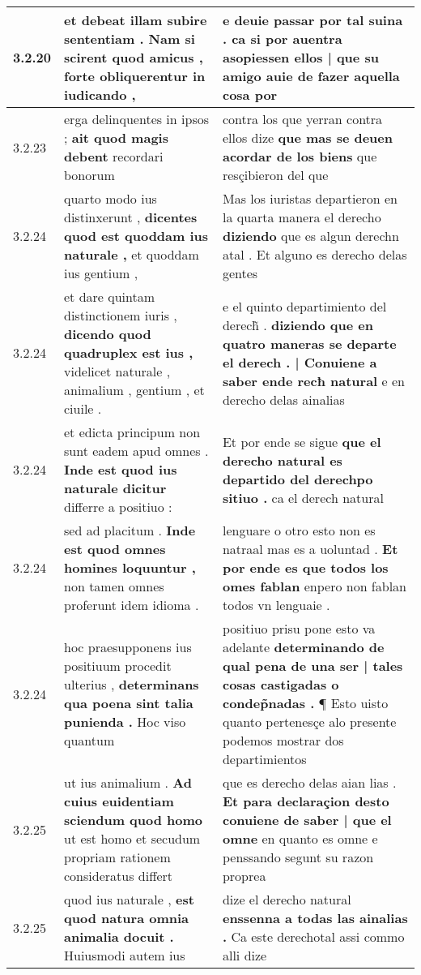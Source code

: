 \begin{tabular}{|p{1cm}|p{6.5cm}|p{6.5cm}|}
3.2.20 & et debeat illam subire sententiam . \textbf{ Nam si scirent quod amicus , } forte obliquerentur in iudicando , & e deuie passar por tal suina . \textbf{ ca si por auentra asopiessen ellos | que su amigo auie de fazer aquella cosa } por \\\hline
3.2.23 & erga delinquentes in ipsos ; \textbf{ ait quod magis debent } recordari bonorum & contra los que yerran contra ellos dize \textbf{ que mas se deuen acordar de los biens } que resçibieron del que \\\hline
3.2.24 & quarto modo ius distinxerunt , \textbf{ dicentes quod est quoddam ius naturale , } et quoddam ius gentium , & Mas los iuristas departieron en la quarta manera el derecho \textbf{ diziendo } que es algun derechn atal . Et alguno es derecho delas gentes \\\hline
3.2.24 & et dare quintam distinctionem iuris , \textbf{ dicendo quod quadruplex est ius , } videlicet naturale , animalium , gentium , et ciuile . & e el quinto departimiento del derech̃ . \textbf{ diziendo que en quatro maneras se departe el derech . | Conuiene a saber ende recħ natural } e en derecho delas ainalias \\\hline
3.2.24 & et edicta principum non sunt eadem apud omnes . \textbf{ Inde est quod ius naturale dicitur } differre a positiuo : & Et por ende se sigue \textbf{ que el derecho natural es departido del derechpo sitiuo . } ca el derech natural \\\hline
3.2.24 & sed ad placitum . \textbf{ Inde est quod omnes homines loquuntur , } non tamen omnes proferunt idem idioma . & lenguare o otro esto non es natraal mas es a uoluntad . \textbf{ Et por ende es que todos los omes fablan } enpero non fablan todos vn lenguaie . \\\hline
3.2.24 & hoc praesupponens ius positiuum procedit ulterius , \textbf{ determinans qua poena sint talia punienda . } Hoc viso quantum & positiuo prisu pone esto va adelante \textbf{ determinando de qual pena de una ser | tales cosas castigadas o condep̃nadas . } ¶ Esto uisto quanto pertenesçe alo presente podemos mostrar dos departimientos \\\hline
3.2.25 & ut ius animalium . \textbf{ Ad cuius euidentiam sciendum quod homo } ut est homo et secudum propriam rationem consideratus differt & que es derecho delas aian lias . \textbf{ Et para declaraçion desto conuiene de saber | que el omne } en quanto es omne e penssando segunt su razon proprea \\\hline
3.2.25 & quod ius naturale , \textbf{ est quod natura omnia animalia docuit . } Huiusmodi autem ius & dize el derecho natural \textbf{ enssenna a todas las ainalias . } Ca este derechotal assi commo alli dize \\\hline

\end{tabular}
